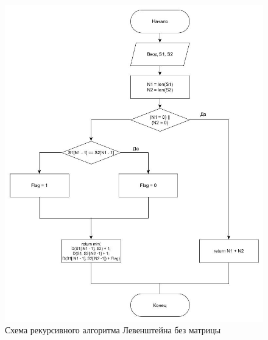 \begin{figure}[hp]
    \begin{center}
        \includegraphics[width=\linewidth]{graph/LevenRec.jpg}
    \end{center}
    \caption{Схема рекурсивного алгоритма Левенштейна без матрицы}
\end{figure}

